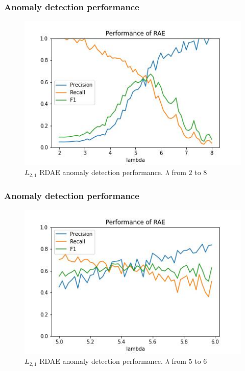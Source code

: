 \documentclass{beamer}
\theoremstyle{plain}
\theoremstyle{definition}
\theoremstyle{remark}
\begin{document}
\begin{frame}
	\frametitle{Anomaly detection performance}
	\begin{figure}
		\centering
		\includegraphics[width=0.8\linewidth]{Images/l21_experiment_from_0.1_to_10.1.jpg}
		\caption[]{$L_{2,1}$ RDAE anomaly detection performance. $\lambda$ from $2$ to $8$}
	\end{figure}
\end{frame}

\begin{frame}
	\frametitle{Anomaly detection performance}
	\begin{figure}
		\centering
		\includegraphics[width=0.8\linewidth]{Images/l21_experiment_from_5.0_to_6.0.jpg}
		\caption[]{$L_{2,1}$ RDAE anomaly detection performance. $\lambda$ from $5$ to $6$}
	\end{figure}
\end{frame}
\end{document}
